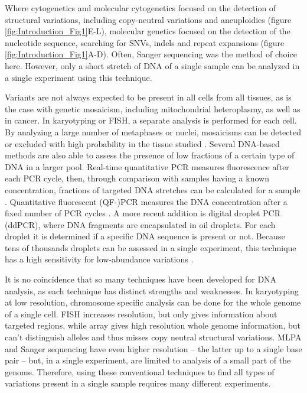Where cytogenetics and molecular cytogenetics focused on the detection of structural variations, including copy-neutral variations and aneuploidies (figure \ref{fig:Introduction_Fig1}E-L), molecular genetics focused on the detection of the nucleotide sequence, searching for SNVs, indels and repeat expansions (figure \ref{fig:Introduction_Fig1}A-D). 
Often, Sanger sequencing was the method of choice here. 
However, only a short stretch of DNA of a single sample can be analyzed in a single experiment using this technique. 

Variants are not always expected to be present in all cells from all tissues, as is the case with genetic mosaicism, including mitochondrial heteroplasmy, as well as in cancer. 
In karyotyping or FISH, a separate analysis is performed for each cell. 
By analyzing a large number of metaphases or nuclei, mosaicisms can be detected or excluded with high probability in the tissue studied \cite{Hook_1977,Sikkema_1997,Wolff_2007}. 
Several DNA-based methods are also able to assess the presence of low fractions of a certain type of DNA in a larger pool. 
Real-time quantitative PCR measures fluorescence after each PCR cycle, then, through comparison with samples having a known concentration, fractions of targeted DNA stretches can be calculated for a sample \cite{Heid_1996}. 
Quantitative fluorescent (QF-)PCR measures the DNA concentration after a fixed number of PCR cycles \cite{Eggeling_1993}. 
A more recent addition is digital droplet PCR (ddPCR), where DNA fragments are encapsulated in oil droplets. 
For each droplet it is determined if a specific DNA sequence is present or not. Because tens of thousands droplets can be assessed in a single experiment, this technique has a high sensitivity for low-abundance variations \cite{Hindson_2011}.

It is no coincidence that so many techniques have been developed for DNA analysis, as each technique has distinct strengths and weaknesses. 
In karyotyping at low resolution, chromosome specific analysis can be done for the whole genome of a single cell. 
FISH increases resolution, but only gives information about targeted regions, while array gives high resolution whole genome information, but can’t distinguish alleles and thus misses copy neutral structural variations. 
MLPA and Sanger sequencing have even higher resolution – the latter up to a single base pair – but, in a single experiment, are limited to analysis of a small part of the genome. 
Therefore, using these conventional techniques to find all types of variations present in a single sample requires many different experiments. 


